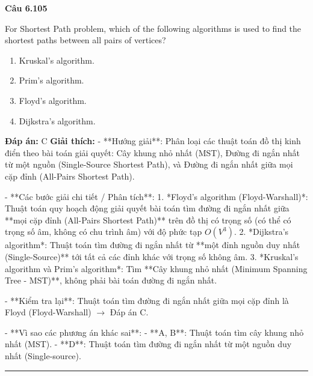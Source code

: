 \documentclass[11pt,a4paper]{article}
\newenvironment{question}[1]{%
  \par\vspace{1em}\noindent\textbf{\large Câu #1}\par\vspace{0.4em}
}{%
  \par\vspace{1em}\hrule\vspace{0.6em}
}
\newenvironment{choices}{%
  \begin{enumerate}[label=\textbf{\Alph*.},leftmargin=2.2em,itemsep=2pt,topsep=3pt]
}{%
  \end{enumerate}
}
\newcommand{\choice}{\item}
\begin{document}
\begin{question}{6.105}
For Shortest Path problem, which of the following algorithms is used to find the shortest paths between all pairs of vertices?
\begin{choices}
\choice Kruskal's algorithm.
\choice Prim's algorithm.
\choice Floyd's algorithm.
\choice Dijkstra's algorithm.
\end{choices}
\textbf{Đáp án:} C
\textbf{Giải thích:} - **Hướng giải**:
  Phân loại các thuật toán đồ thị kinh điển theo bài toán giải quyết: Cây khung nhỏ nhất (MST), Đường đi ngắn nhất từ một nguồn (Single-Source Shortest Path), và Đường đi ngắn nhất giữa mọi cặp đỉnh (All-Pairs Shortest Path).

- **Các bước giải chi tiết / Phân tích**:
  1. *Floyd's algorithm (Floyd-Warshall)*: Thuật toán quy hoạch động giải quyết bài toán tìm đường đi ngắn nhất giữa **mọi cặp đỉnh (All-Pairs Shortest Path)** trên đồ thị có trọng số (có thể có trọng số âm, không có chu trình âm) với độ phức tạp \(O(V^3)\).
  2. *Dijkstra's algorithm*: Thuật toán tìm đường đi ngắn nhất từ **một đỉnh nguồn duy nhất (Single-Source)** tới tất cả các đỉnh khác với trọng số không âm.
  3. *Kruskal's algorithm và Prim's algorithm*: Tìm **Cây khung nhỏ nhất (Minimum Spanning Tree - MST)**, không phải bài toán đường đi ngắn nhất.

- **Kiểm tra lại**:
  Thuật toán tìm đường đi ngắn nhất giữa mọi cặp đỉnh là Floyd (Floyd-Warshall) \(\rightarrow\) Đáp án C.

- **Vì sao các phương án khác sai**:
  - **A, B**: Thuật toán tìm cây khung nhỏ nhất (MST).
  - **D**: Thuật toán tìm đường đi ngắn nhất từ một nguồn duy nhất (Single-source).
\end{question}
\end{document}
